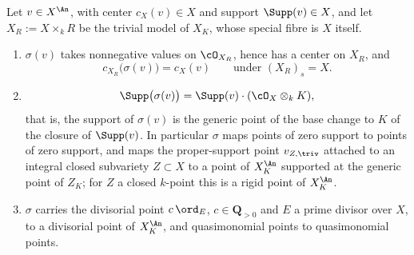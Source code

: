 \begin{theorem}
\label{thm:ch30-gauss-centers-supports}
Let \(v\in X^{\An}\), with center \(c_X(v)\in X\) and support
\(\Supp(v)\in X\), and let \(X_R:=X\times_kR\) be the trivial model of
\(X_K\), whose special fibre is \(X\) itself.
\begin{enumerate}
\item\label{itm:ch30-gcs:center}
\(\sigma(v)\) takes nonnegative values on \(\cO_{X_R}\), hence has a center
on \(X_R\), and
\begin{equation}
\label{eq:ch30-gauss-center}
 c_{X_R}\bigl(\sigma(v)\bigr)=c_X(v)
 \qquad\text{under }(X_R)_s=X .
\end{equation}
\item\label{itm:ch30-gcs:support}
\begin{equation}
\label{eq:ch30-gauss-support}
 \Supp\bigl(\sigma(v)\bigr)=\Supp(v)\cdot(\cO_X\otimes_kK),
\end{equation}
that is, the support of \(\sigma(v)\) is the generic point of the base
change to \(K\) of the closure of \(\Supp(v)\).  In particular \(\sigma\)
maps points of zero support to points of zero support, and maps the
proper-support point \(v_{Z,\triv}\) attached to an integral closed
subvariety \(Z\subset X\) to a point of \(X_K^{\An}\) supported at the
generic point of \(Z_K\); for \(Z\) a closed \(k\)-point this is a rigid
point of \(X_K^{\An}\).
\item\label{itm:ch30-gcs:divisorial}
\(\sigma\) carries the divisorial point \(c\,\ord_E\), \(c\in\mathbf
Q_{>0}\) and \(E\) a prime divisor over \(X\), to a divisorial point of
\(X_K^{\An}\), and quasimonomial points to quasimonomial points.
\end{enumerate}
\end{theorem}

